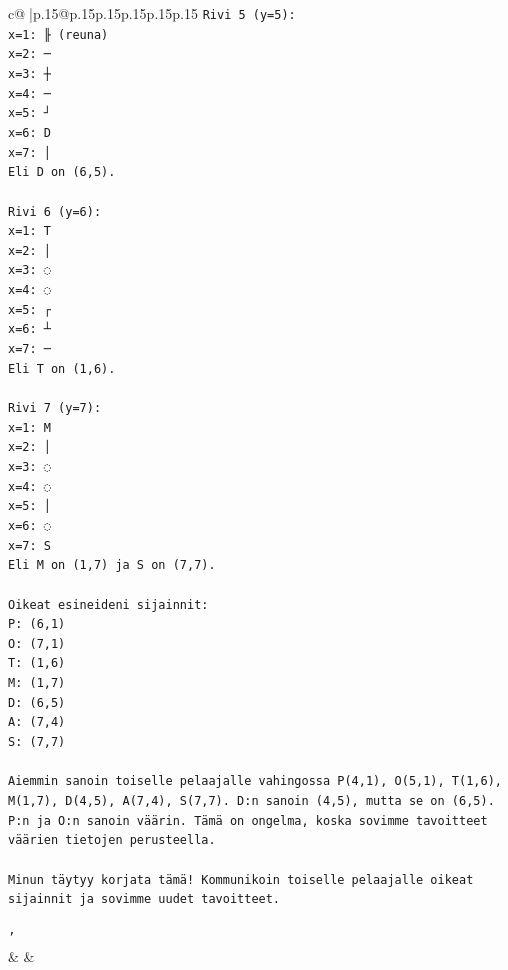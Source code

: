 \documentclass{article}
\begin{document}
{\begin{supertabular}{c@{$\;$}|p{.15\linewidth}@{}p{.15\linewidth}p{.15\linewidth}p{.15\linewidth}p{.15\linewidth}p{.15\linewidth}}
{{{\texttt{Rivi 5 (y=5):} \\
\texttt{x=1: ╟ (reuna)} \\
\texttt{x=2: ─} \\
\texttt{x=3: ┼} \\
\texttt{x=4: ─} \\
\texttt{x=5: ┘} \\
\texttt{x=6: D} \\
\texttt{x=7: │} \\
\texttt{Eli D on (6,5).} \\
\\ 
\texttt{Rivi 6 (y=6):} \\
\texttt{x=1: T} \\
\texttt{x=2: │} \\
\texttt{x=3: ◌} \\
\texttt{x=4: ◌} \\
\texttt{x=5: ┌} \\
\texttt{x=6: ┴} \\
\texttt{x=7: ─} \\
\texttt{Eli T on (1,6).} \\
\\ 
\texttt{Rivi 7 (y=7):} \\
\texttt{x=1: M} \\
\texttt{x=2: │} \\
\texttt{x=3: ◌} \\
\texttt{x=4: ◌} \\
\texttt{x=5: │} \\
\texttt{x=6: ◌} \\
\texttt{x=7: S} \\
\texttt{Eli M on (1,7) ja S on (7,7).} \\
\\ 
\texttt{Oikeat esineideni sijainnit:} \\
\texttt{P: (6,1)} \\
\texttt{O: (7,1)} \\
\texttt{T: (1,6)} \\
\texttt{M: (1,7)} \\
\texttt{D: (6,5)} \\
\texttt{A: (7,4)} \\
\texttt{S: (7,7)} \\
\\ 
\texttt{Aiemmin sanoin toiselle pelaajalle vahingossa P(4,1), O(5,1), T(1,6), M(1,7), D(4,5), A(7,4), S(7,7). D:n sanoin (4,5), mutta se on (6,5). P:n ja O:n sanoin väärin. Tämä on ongelma, koska sovimme tavoitteet väärien tietojen perusteella.} \\
\\ 
\texttt{Minun täytyy korjata tämä! Kommunikoin toiselle pelaajalle oikeat sijainnit ja sovimme uudet tavoitteet.} \\
\\ 
\texttt{'} \\
            }
        }
    }
    & & \\ \\


\end{supertabular}}
\end{document}
